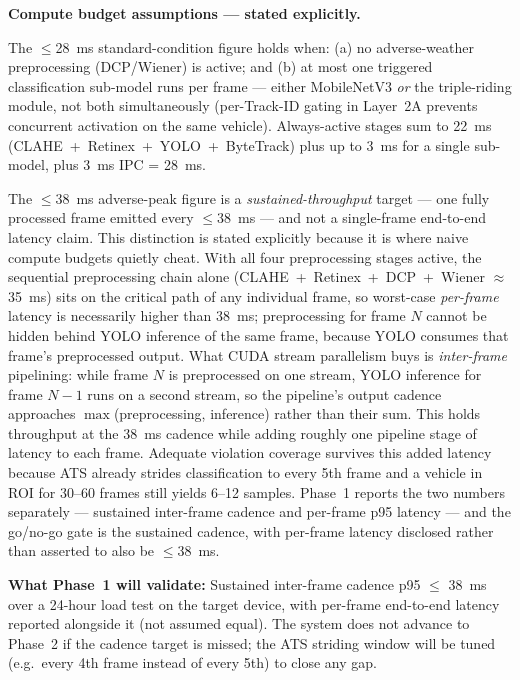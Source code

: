 \documentclass[11pt,a4paper]{article}
\begin{document}
\begin{callout}
\textbf{Compute budget assumptions — stated explicitly.}

The $\leq$28~ms standard-condition figure holds when: (a) no adverse-weather preprocessing (DCP/Wiener) is active; and (b) at most one triggered classification sub-model runs per frame — either MobileNetV3 \emph{or} the triple-riding module, not both simultaneously (per-Track-ID gating in Layer~2A prevents concurrent activation on the same vehicle). Always-active stages sum to 22~ms (CLAHE~+~Retinex~+~YOLO~+~ByteTrack) plus up to 3~ms for a single sub-model, plus 3~ms IPC = 28~ms.

The $\leq$38~ms adverse-peak figure is a \emph{sustained-throughput} target --- one fully processed frame emitted every $\leq$38~ms --- and not a single-frame end-to-end latency claim. This distinction is stated explicitly because it is where naive compute budgets quietly cheat. With all four preprocessing stages active, the sequential preprocessing chain alone (CLAHE~+~Retinex~+~DCP~+~Wiener $\approx$ 35~ms) sits on the critical path of any individual frame, so worst-case \emph{per-frame} latency is necessarily higher than 38~ms; preprocessing for frame $N$ cannot be hidden behind YOLO inference of the same frame, because YOLO consumes that frame's preprocessed output. What CUDA stream parallelism buys is \emph{inter-frame} pipelining: while frame $N$ is preprocessed on one stream, YOLO inference for frame $N{-}1$ runs on a second stream, so the pipeline's output cadence approaches $\max$(preprocessing, inference) rather than their sum. This holds throughput at the 38~ms cadence while adding roughly one pipeline stage of latency to each frame. Adequate violation coverage survives this added latency because ATS already strides classification to every 5th frame and a vehicle in ROI for 30--60 frames still yields 6--12 samples. Phase~1 reports the two numbers separately --- sustained inter-frame cadence and per-frame p95 latency --- and the go/no-go gate is the sustained cadence, with per-frame latency disclosed rather than asserted to also be $\leq$38~ms.

\textbf{What Phase~1 will validate:} Sustained inter-frame cadence p95 $\leq$ 38~ms over a 24-hour load test on the target device, with per-frame end-to-end latency reported alongside it (not assumed equal). The system does not advance to Phase~2 if the cadence target is missed; the ATS striding window will be tuned (e.g.\ every 4th frame instead of every 5th) to close any gap.
\end{callout}
\end{document}
